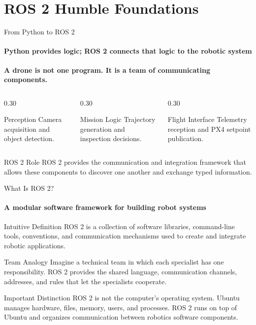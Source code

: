\section{ROS 2 Humble Foundations}

\begin{frame}{From Python to ROS 2}
\framesubtitle{Python provides logic; ROS 2 connects that logic to the robotic system}
\begin{center}
\large
\textbf{A drone is not one program. It is a team of communicating components.}
\end{center}
\pause
\begin{columns}[T,onlytextwidth]
\begin{column}{0.30\textwidth}
\begin{block}{Perception}
Camera acquisition and object detection.
\end{block}
\end{column}
\hfill
\begin{column}{0.30\textwidth}
\begin{block}{Mission Logic}
Trajectory generation and inspection decisions.
\end{block}
\end{column}
\hfill
\begin{column}{0.30\textwidth}
\begin{block}{Flight Interface}
Telemetry reception and PX4 setpoint publication.
\end{block}
\end{column}
\end{columns}
\begin{exampleblock}{ROS 2 Role}
ROS 2 provides the communication and integration framework that allows these components to discover one another and exchange typed information.
\end{exampleblock}
\end{frame}




\begin{frame}{What Is ROS 2?}
\framesubtitle{A modular software framework for building robot systems}
\begin{block}{Intuitive Definition}
ROS 2 is a collection of software libraries, command-line tools, conventions, and communication mechanisms used to create and integrate robotic applications.
\end{block}
\pause
\begin{exampleblock}{Team Analogy}
Imagine a technical team in which each specialist has one responsibility. ROS 2 provides the shared language, communication channels, addresses, and rules that let the specialists cooperate.
\end{exampleblock}
\begin{alertblock}{Important Distinction}
ROS 2 is not the computer's operating system. Ubuntu manages hardware, files, memory, users, and processes. ROS 2 runs on top of Ubuntu and organizes communication between robotics software components.
\end{alertblock}
\end{frame}


